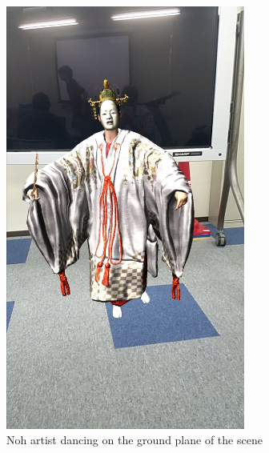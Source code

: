 \documentclass[a4paper, 10pt, american, titlepage]{article}
\begin{document}
\begin{figure}[h]
	\centering
	\includegraphics[width=0.7\textwidth]{no-ar-working.jpg}
	\caption{Noh artist dancing on the ground plane of the scene}
	\label{fig:noArWorking}
\end{figure}
\end{document}
